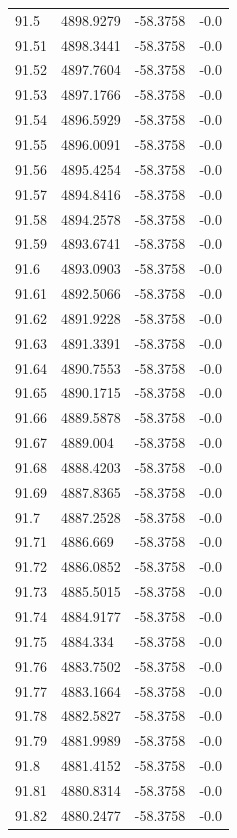 \begin{table}[H]
\begin{tabular}{llll}
91.5 & 4898.9279 & -58.3758 & -0.0 \\
91.51 & 4898.3441 & -58.3758 & -0.0 \\
91.52 & 4897.7604 & -58.3758 & -0.0 \\
91.53 & 4897.1766 & -58.3758 & -0.0 \\
91.54 & 4896.5929 & -58.3758 & -0.0 \\
91.55 & 4896.0091 & -58.3758 & -0.0 \\
91.56 & 4895.4254 & -58.3758 & -0.0 \\
91.57 & 4894.8416 & -58.3758 & -0.0 \\
91.58 & 4894.2578 & -58.3758 & -0.0 \\
91.59 & 4893.6741 & -58.3758 & -0.0 \\
91.6 & 4893.0903 & -58.3758 & -0.0 \\
91.61 & 4892.5066 & -58.3758 & -0.0 \\
91.62 & 4891.9228 & -58.3758 & -0.0 \\
91.63 & 4891.3391 & -58.3758 & -0.0 \\
91.64 & 4890.7553 & -58.3758 & -0.0 \\
91.65 & 4890.1715 & -58.3758 & -0.0 \\
91.66 & 4889.5878 & -58.3758 & -0.0 \\
91.67 & 4889.004 & -58.3758 & -0.0 \\
91.68 & 4888.4203 & -58.3758 & -0.0 \\
91.69 & 4887.8365 & -58.3758 & -0.0 \\
91.7 & 4887.2528 & -58.3758 & -0.0 \\
91.71 & 4886.669 & -58.3758 & -0.0 \\
91.72 & 4886.0852 & -58.3758 & -0.0 \\
91.73 & 4885.5015 & -58.3758 & -0.0 \\
91.74 & 4884.9177 & -58.3758 & -0.0 \\
91.75 & 4884.334 & -58.3758 & -0.0 \\
91.76 & 4883.7502 & -58.3758 & -0.0 \\
91.77 & 4883.1664 & -58.3758 & -0.0 \\
91.78 & 4882.5827 & -58.3758 & -0.0 \\
91.79 & 4881.9989 & -58.3758 & -0.0 \\
91.8 & 4881.4152 & -58.3758 & -0.0 \\
91.81 & 4880.8314 & -58.3758 & -0.0 \\
91.82 & 4880.2477 & -58.3758 & -0.0 \\

\end{tabular}
\end{table}
